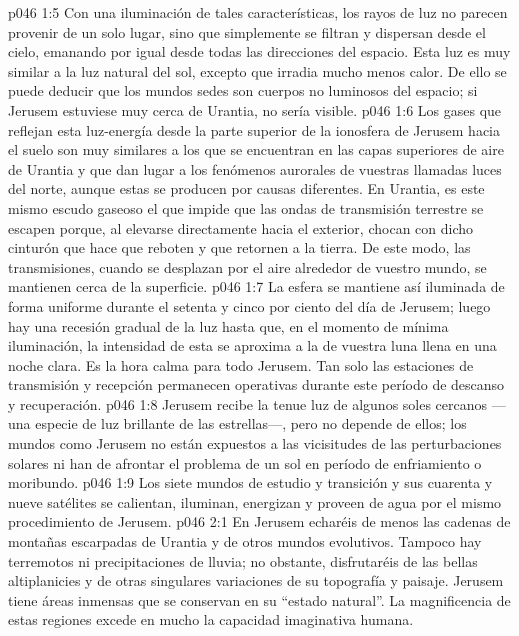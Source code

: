 \vs p046 1:5 Con una iluminación de tales características, los rayos de luz no parecen provenir de un solo lugar, sino que simplemente se filtran y dispersan desde el cielo, emanando por igual desde todas las direcciones del espacio. Esta luz es muy similar a la luz natural del sol, excepto que irradia mucho menos calor. De ello se puede deducir que los mundos sedes son cuerpos no luminosos del espacio; si Jerusem estuviese muy cerca de Urantia, no sería visible.
\vs p046 1:6 Los gases que reflejan esta luz\hyp{}energía desde la parte superior de la ionosfera de Jerusem hacia el suelo son muy similares a los que se encuentran en las capas superiores de aire de Urantia y que dan lugar a los fenómenos aurorales de vuestras llamadas luces del norte, aunque estas se producen por causas diferentes. En Urantia, es este mismo escudo gaseoso el que impide que las ondas de transmisión terrestre se escapen porque, al elevarse directamente hacia el exterior, chocan con dicho cinturón que hace que reboten y que retornen a la tierra. De este modo, las transmisiones, cuando se desplazan por el aire alrededor de vuestro mundo, se mantienen cerca de la superficie.
\vs p046 1:7 La esfera se mantiene así iluminada de forma uniforme durante el setenta y cinco por ciento del día de Jerusem; luego hay una recesión gradual de la luz hasta que, en el momento de mínima iluminación, la intensidad de esta se aproxima a la de vuestra luna llena en una noche clara. Es la hora calma para todo Jerusem. Tan solo las estaciones de transmisión y recepción permanecen operativas durante este período de descanso y recuperación.
\vs p046 1:8 \pc Jerusem recibe la tenue luz de algunos soles cercanos ---una especie de luz brillante de las estrellas---, pero no depende de ellos; los mundos como Jerusem no están expuestos a las vicisitudes de las perturbaciones solares ni han de afrontar el problema de un sol en período de enfriamiento o moribundo.
\vs p046 1:9 Los siete mundos de estudio y transición y sus cuarenta y nueve satélites se calientan, iluminan, energizan y proveen de agua por el mismo procedimiento de Jerusem.
\vs p046 2:1 En Jerusem echaréis de menos las cadenas de montañas escarpadas de Urantia y de otros mundos evolutivos. Tampoco hay terremotos ni precipitaciones de lluvia; no obstante, disfrutaréis de las bellas altiplanicies y de otras singulares variaciones de su topografía y paisaje. Jerusem tiene áreas inmensas que se conservan en su “estado natural”. La magnificencia de estas regiones excede en mucho la capacidad imaginativa humana.
